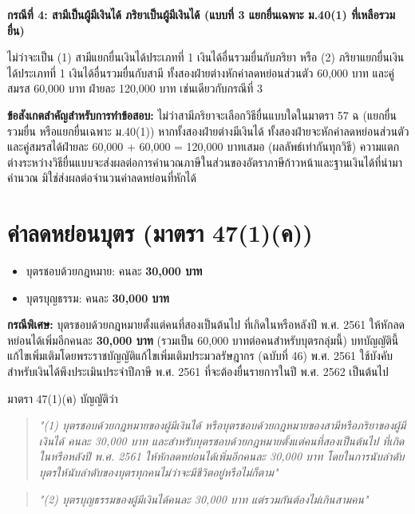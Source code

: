 \documentclass[12pt,a4paper]{article}
\newcommand{\hilight}[1]{\textbf{#1}}
\begin{document}
\textbf{กรณีที่ 4: สามีเป็นผู้มีเงินได้ ภริยาเป็นผู้มีเงินได้ (แบบที่ 3 แยกยื่นเฉพาะ ม.40(1) ที่เหลือรวมยื่น)}

ไม่ว่าจะเป็น (1) สามีแยกยื่นเงินได้ประเภทที่ 1 เงินได้อื่นรวมยื่นกับภริยา หรือ (2) ภริยาแยกยื่นเงินได้ประเภทที่ 1 เงินได้อื่นรวมยื่นกับสามี ทั้งสองฝ่ายต่างหักค่าลดหย่อนส่วนตัว 60,000 บาท และคู่สมรส 60,000 บาท ฝ่ายละ 120,000 บาท เช่นเดียวกับกรณีที่ 3

\hilight{ข้อสังเกตสำคัญสำหรับการทำข้อสอบ:} ไม่ว่าสามีภริยาจะเลือกวิธียื่นแบบใดในมาตรา 57 ฉ (แยกยื่น รวมยื่น หรือแยกยื่นเฉพาะ ม.40(1)) หากทั้งสองฝ่ายต่างมีเงินได้ ทั้งสองฝ่ายจะหักค่าลดหย่อนส่วนตัวและคู่สมรสได้ฝ่ายละ 60,000 + 60,000 = 120,000 บาทเสมอ (ผลลัพธ์เท่ากันทุกวิธี) ความแตกต่างระหว่างวิธียื่นแบบจะส่งผลต่อการคำนวณภาษีในส่วนของอัตราภาษีก้าวหน้าและฐานเงินได้ที่นำมาคำนวณ มิใช่ส่งผลต่อจำนวนค่าลดหย่อนที่หักได้

\newpage
\section{ค่าลดหย่อนบุตร (มาตรา 47(1)(ค))}

\begin{itemize}
    \item บุตรชอบด้วยกฎหมาย: คนละ \hilight{30,000 บาท}
    \item บุตรบุญธรรม: คนละ \hilight{30,000 บาท}
\end{itemize}

\textbf{กรณีพิเศษ:} บุตรชอบด้วยกฎหมายตั้งแต่คนที่สองเป็นต้นไป ที่เกิดในหรือหลังปี พ.ศ. 2561 ให้หักลดหย่อนได้เพิ่มอีกคนละ \hilight{30,000 บาท} (รวมเป็น 60,000 บาทต่อคนสำหรับบุตรกลุ่มนี้) บทบัญญัตินี้แก้ไขเพิ่มเติมโดยพระราชบัญญัติแก้ไขเพิ่มเติมประมวลรัษฎากร (ฉบับที่ 46) พ.ศ. 2561 ใช้บังคับสำหรับเงินได้พึงประเมินประจำปีภาษี พ.ศ. 2561 ที่จะต้องยื่นรายการในปี พ.ศ. 2562 เป็นต้นไป

มาตรา 47(1)(ค) บัญญัติว่า

\begin{quote}
\textit{"(1) บุตรชอบด้วยกฎหมายของผู้มีเงินได้ หรือบุตรชอบด้วยกฎหมายของสามีหรือภริยาของผู้มีเงินได้ คนละ 30,000 บาท และสำหรับบุตรชอบด้วยกฎหมายตั้งแต่คนที่สองเป็นต้นไป ที่เกิดในหรือหลังปี พ.ศ. 2561 ให้หักลดหย่อนได้เพิ่มอีกคนละ 30,000 บาท โดยในการนับลำดับบุตรให้นับลำดับของบุตรทุกคนไม่ว่าจะมีชีวิตอยู่หรือไม่ก็ตาม"}
\end{quote}

\begin{quote}
\textit{"(2) บุตรบุญธรรมของผู้มีเงินได้คนละ 30,000 บาท แต่รวมกันต้องไม่เกินสามคน"}
\end{quote}
\end{document}
